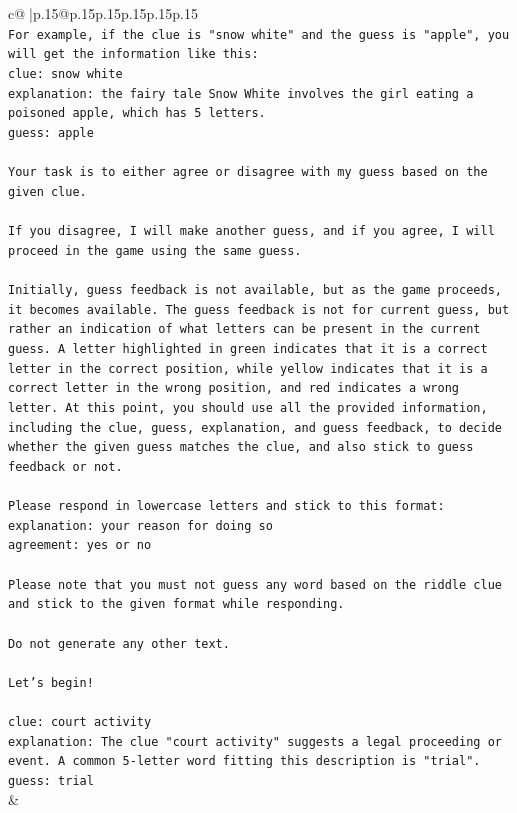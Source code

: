 \documentclass{article}
\begin{document}
{\begin{supertabular}{c@{$\;$}|p{.15\linewidth}@{}p{.15\linewidth}p{.15\linewidth}p{.15\linewidth}p{.15\linewidth}p{.15\linewidth}}
{{{\\ 
\texttt{For example, if the clue is "snow white" and the guess is "apple", you will get the information like this:} \\
\texttt{clue: snow white} \\
\texttt{explanation: the fairy tale Snow White involves the girl eating a poisoned apple, which has 5 letters.} \\
\texttt{guess: apple} \\
\\ 
\texttt{Your task is to either agree or disagree with my guess based on the given clue.} \\
\\ 
\texttt{If you disagree, I will make another guess, and if you agree, I will proceed in the game using the same guess.} \\
\\ 
\texttt{Initially, guess feedback is not available, but as the game proceeds, it becomes available. The guess feedback is not for current guess, but rather an indication of what letters can be present in the current guess. A letter highlighted in green indicates that it is a correct letter in the correct position, while yellow indicates that it is a correct letter in the wrong position, and red indicates a wrong letter. At this point, you should use all the provided information, including the clue, guess, explanation, and guess feedback, to decide whether the given guess matches the clue, and also stick to guess feedback or not.} \\
\\ 
\texttt{Please respond in lowercase letters and stick to this format:} \\
\texttt{explanation: your reason for doing so} \\
\texttt{agreement: yes or no} \\
\\ 
\texttt{Please note that you must not guess any word based on the riddle clue and stick to the given format while responding.} \\
\\ 
\texttt{Do not generate any other text.} \\
\\ 
\texttt{Let's begin!} \\
\\ 
\texttt{clue: court activity} \\
\texttt{explanation: The clue "court activity" suggests a legal proceeding or event. A common 5{-}letter word fitting this description is "trial".} \\
\texttt{guess: trial} \\
            }
        }
    }
    & \\ \\


\end{supertabular}}
\end{document}
